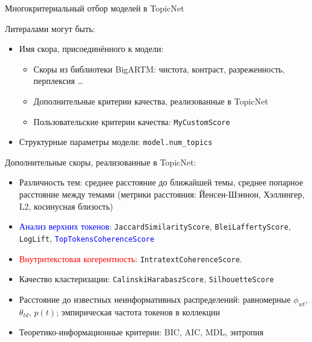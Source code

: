 \begin{frame}[t]{Многокритериальный отбор моделей в TopicNet}

Литералами могут быть:
{\small
    \begin{itemize}
        \setlength\itemsep{0em}
        \item Имя скора, присоединённого к модели:
            \begin{itemize}
            \item{Скоры из библиотеки BigARTM: чистота, контраст, разреженность, перплексия \dots}
            \item{Дополнительные критерии качества, реализованные в TopicNet}
            \item{Пользовательские критерии качества: \texttt{MyCustomScore}}
        \end{itemize}
        \item Структурные параметры модели: \texttt{model.num\_topics}
    \end{itemize}}
Дополнительные скоры, реализованные в TopicNet: 
{\small
    \begin{itemize}
        \setlength\itemsep{0em}
        \item Различность тем: среднее расстояние до ближайшей темы, среднее попарное расстояние между темами (метрики расстояния: Йенсен-Шэннон, Хэллингер, L2, косинусная близость)
        \item \textcolor{blue}{Анализ верхних токенов}: \texttt{JaccardSimilarityScore}, \texttt{BleiLaffertyScore}, \texttt{LogLift}, \textcolor{blue}{\texttt{TopTokensCoherenceScore}}
        \item \textcolor{red}{Внутритекстовая когерентность}: \texttt{IntratextCoherenceScore}.
        \item Качество кластеризации: \texttt{CalinskiHarabaszScore}, \texttt{SilhouetteScore}
        \item Расстояние до известных неинформативных распределений: равномерные $\phi_{wt}$, $\theta_{td}$, $p(t)$; эмпирическая частота токенов в коллекции
        \item Теоретико-информационные критерии: BIC, AIC, MDL, энтропия
    \end{itemize}}
\end{frame}

